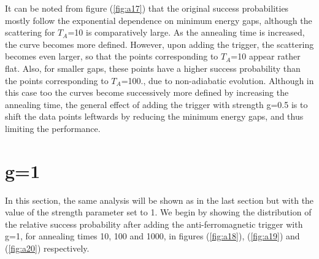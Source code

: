 \documentclass[12]{article}
\begin{document}
It can be noted from figure (\ref{fig:a17}) that the original success probabilities mostly follow the exponential dependence on minimum energy gaps, although the scattering for $T_A$=10 is comparatively large. As the annealing time is increased, the curve becomes more defined. However, upon adding the trigger, the scattering becomes even larger, so that the points corresponding to $T_A$=10 appear rather flat. Also, for smaller gaps, these points have a higher success probability than the points corresponding to $T_A$=100., due to non-adiabatic evolution. Although in this case too the curves become successively more defined by increasing the annealing time, the general effect of adding the trigger with strength g=0.5 is to shift the data points leftwards by reducing the minimum energy gaps, and thus limiting the performance.



\section*{g=1}
In this section, the same analysis will be shown as in the last section but with the value of the strength parameter set to 1. We begin by showing the distribution of the relative success probability after adding the anti-ferromagnetic trigger with g=1, for annealing times 10, 100 and 1000, in figures (\ref{fig:a18}), (\ref{fig:a19}) and (\ref{fig:a20}) respectively.
\end{document}
